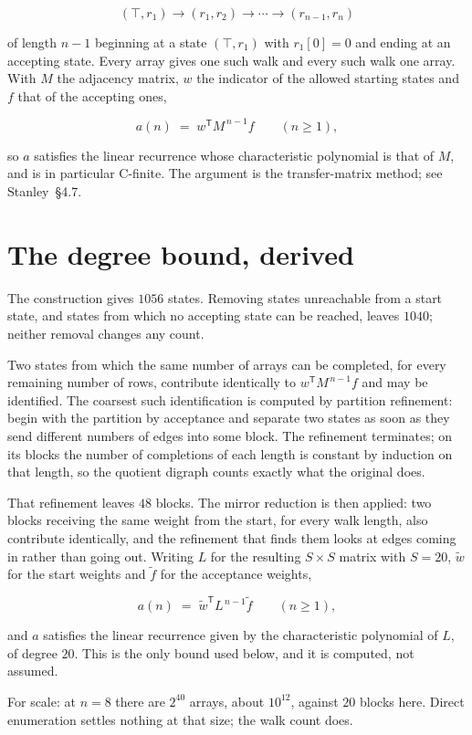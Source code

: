 \documentclass[11pt]{article}
\theoremstyle{definition}
\begin{document}
\[(\top,r_1) \to (r_1,r_2) \to \cdots \to (r_{n-1},r_n)\]

of length $n-1$ beginning at a state $(\top,r_1)$ with $r_1[0]=0$ and ending at an accepting state. Every array gives one such walk and every such walk one array. With $M$ the adjacency matrix, $w$ the indicator of the allowed starting states and $f$ that of the accepting ones,

\[a(n) \;=\; w^{\mathsf T} M^{\,n-1} f \qquad (n \ge 1),\]

so $a$ satisfies the linear recurrence whose characteristic polynomial is that of $M$, and is in particular C-finite. The argument is the transfer-matrix method; see Stanley~\S4.7.

\section{The degree bound, derived}

The construction gives $1056$ states. Removing states unreachable from a start state, and states from which no accepting state can be reached, leaves $1040$; neither removal changes any count.

Two states from which the same number of arrays can be completed, for every remaining number of rows, contribute identically to $w^{\mathsf T}M^{\,n-1}f$ and may be identified. The coarsest such identification is computed by partition refinement: begin with the partition by acceptance and separate two states as soon as they send different numbers of edges into some block. The refinement terminates; on its blocks the number of completions of each length is constant by induction on that length, so the quotient digraph counts exactly what the original does.

That refinement leaves $48$ blocks. The mirror reduction is then applied: two blocks receiving the same weight from the start, for every walk length, also contribute identically, and the refinement that finds them looks at edges coming in rather than going out. Writing $L$ for the resulting $S \times S$ matrix with $S = 20$, $\tilde w$ for the start weights and $\tilde f$ for the acceptance weights,

\[a(n) \;=\; \tilde w^{\mathsf T} L^{\,n-1} \tilde f \qquad (n \ge 1),\]

and $a$ satisfies the linear recurrence given by the characteristic polynomial of $L$, of degree $20$. This is the only bound used below, and it is computed, not assumed.

For scale: at $n = 8$ there are $2^{40}$ arrays, about $10^{12}$, against $20$ blocks here. Direct enumeration settles nothing at that size; the walk count does.
\end{document}
